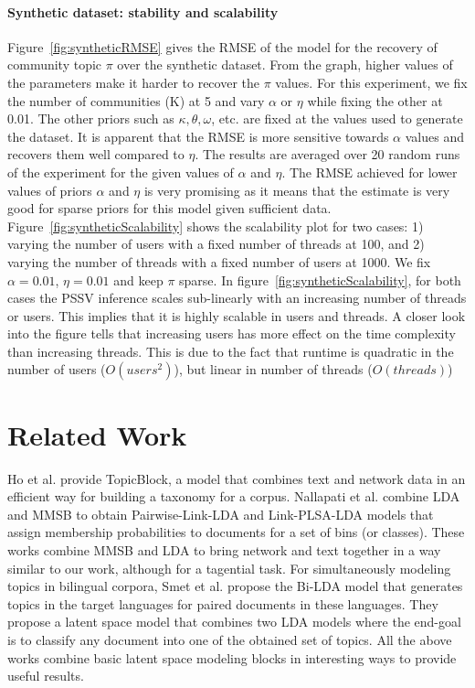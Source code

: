 \documentclass{sig-alternate}
\newcommand{\abhi}[1]{\textcolor{blue}{\\ abhi-comment: #1}}
\begin{document}
\paragraph{Synthetic dataset: stability and scalability}
Figure~\ref{fig:syntheticRMSE} gives the RMSE of the model for the recovery of
community topic $\pi$ over the synthetic dataset. From the graph, higher values
of the parameters make it harder to recover the $\pi$ values. For this experiment,
we fix the number of communities (K) at 5 and vary $\alpha$ or $\eta$ while fixing the other at
0.01. The other priors such as $\kappa, \theta,
\omega$, etc. are fixed at the values used to generate the dataset.  
It is apparent that the RMSE is more sensitive towards $\alpha$ values and
recovers them well compared to $\eta$. The results are averaged over 20 random
runs of the experiment for the given values of $\alpha$ and $\eta$. The RMSE
achieved for lower values of priors $\alpha$ and $\eta$ is very promising as
it means that the estimate is very good for sparse
priors for this model given sufficient data. 
Figure~\ref{fig:syntheticScalability} shows the scalability plot for two cases:
1) varying the number of users with a fixed number of threads at 100, and 2) 
varying the number of 
threads with a fixed number of users at 1000. We fix 
$\alpha=0.01$, $\eta=0.01$ and keep $\pi$ sparse.
In figure~\ref{fig:syntheticScalability}, for both cases 
the PSSV inference scales sub-linearly with an increasing number of threads or users. 
This implies that it is highly scalable in users and threads. A closer look
into the figure tells that increasing users has more effect on the time complexity 
than increasing threads. This is due to the fact that runtime is 
quadratic 
in the number of users ($O(users^2)$), but linear in number of threads ($O(threads)$)


\section{Related Work}

Ho et al.
\cite{Ho:2012:DHT:2187836.2187936} provide TopicBlock, a model 
that combines text and
network data in an efficient way for building a taxonomy for a corpus.
Nallapati et al. \cite{Nallapati:2008:JLT:1401890.1401957}
combine LDA and MMSB to obtain 
Pairwise-Link-LDA and Link-PLSA-LDA models that assign membership 
probabilities to documents for a set of bins (or classes).
These works 
combine MMSB and LDA to bring network and text together in a way
similar to our work, although for a tagential task. 
For simultaneously modeling topics in bilingual corpora, Smet et al.
\cite{Smet:2011:KTA:2017863.2017915} propose the Bi-LDA model that generates
topics in the target languages for paired documents in these languages.
They propose a latent space model that combines two LDA models 
where the end-goal is to classify any document into one of the
obtained set of topics. All the above works combine basic latent space modeling
blocks in interesting ways to provide useful results.  
\end{document}
